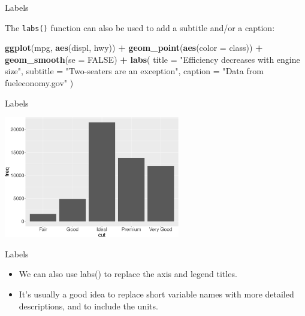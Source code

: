 \documentclass[ignorenonframetext,]{beamer}
\newenvironment{Shaded}{\begin{snugshade}}{\end{snugshade}}
\newcommand{\DataTypeTok}[1]{\textcolor[rgb]{0.13,0.29,0.53}{#1}}
\newcommand{\KeywordTok}[1]{\textcolor[rgb]{0.13,0.29,0.53}{\textbf{#1}}}
\newcommand{\NormalTok}[1]{#1}
\newcommand{\OperatorTok}[1]{\textcolor[rgb]{0.81,0.36,0.00}{\textbf{#1}}}
\newcommand{\OtherTok}[1]{\textcolor[rgb]{0.56,0.35,0.01}{#1}}
\newcommand{\StringTok}[1]{\textcolor[rgb]{0.31,0.60,0.02}{#1}}
\begin{document}
\begin{frame}[fragile]{Labels}
\protect\hypertarget{labels-2}{}

The \texttt{labs()} function can also be used to add a subtitle and/or a
caption:

\begin{Shaded}
\begin{Highlighting}[]
\KeywordTok{ggplot}\NormalTok{(mpg, }\KeywordTok{aes}\NormalTok{(displ, hwy)) }\OperatorTok{+}
\StringTok{  }\KeywordTok{geom_point}\NormalTok{(}\KeywordTok{aes}\NormalTok{(}\DataTypeTok{color =}\NormalTok{ class)) }\OperatorTok{+}
\StringTok{  }\KeywordTok{geom_smooth}\NormalTok{(}\DataTypeTok{se =} \OtherTok{FALSE}\NormalTok{) }\OperatorTok{+}
\StringTok{  }\KeywordTok{labs}\NormalTok{(}
    \DataTypeTok{title =} \StringTok{"Efficiency decreases with engine size"}\NormalTok{,}
    \DataTypeTok{subtitle =} \StringTok{"Two-seaters are an exception"}\NormalTok{,}
    \DataTypeTok{caption =} \StringTok{"Data from fueleconomy.gov"}
\NormalTok{  )}
\end{Highlighting}
\end{Shaded}

\end{frame}

\begin{frame}{Labels}
\protect\hypertarget{labels-3}{}

\begin{center}\includegraphics[height=200px]{data-visualization_files/figure-beamer/unnamed-chunk-115-1} \end{center}

\end{frame}

\begin{frame}{Labels}
\protect\hypertarget{labels-4}{}

\begin{itemize}
\item
  We can also use labs() to replace the axis and legend titles.
\item
  It's usually a good idea to replace short variable names with more
  detailed descriptions, and to include the units.
\end{itemize}

\end{frame}
\end{document}
